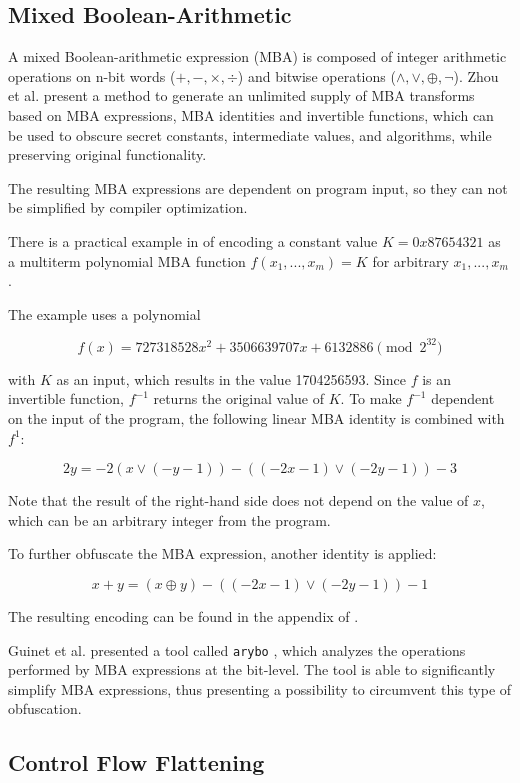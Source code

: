 \documentclass[
  digital, %
  notable,   %
  twoside, %
  nolof,     %
  nolot,     %
]{fithesis3}
\theoremstyle{definition}
\begin{document}
\subsection{Mixed Boolean-Arithmetic} \label{mba}
A mixed Boolean-arithmetic expression (MBA) is composed of integer arithmetic operations on n-bit words ($+,-,\times, \div$) and bitwise operations ($\wedge, \vee, \oplus, \neg$). Zhou et al. \cite{mba_zhou} present a method to generate an unlimited supply of MBA transforms based on MBA expressions, MBA identities and invertible functions, which can be used to obscure secret constants, intermediate values, and algorithms, while preserving original functionality. %

The resulting MBA expressions are dependent on program input, so they can not be simplified by compiler optimization. 

There is a practical example in \cite{mba_zhou} of encoding a constant value $K=0x87654321$ as a multiterm polynomial MBA function $f(x_1,...,x_m) = K$ for arbitrary $x_1,...,x_m$.

The example uses a polynomial

$$ f(x) = 727318528x^2 + 3506639707x + 6132886 \pmod{2^{32}}$$

with $K$ as an input, which results in the value 1704256593. Since $f$ is an invertible function, $f^{-1}$ returns the original value of $K$. To make $f^{-1}$ dependent on the input of the program, the following linear MBA identity is combined with $f^1$:

$$2y = -2(x \vee(-y-1))-((-2x-1)\vee(-2y-1))-3$$

Note that the result of the right-hand side does not depend on the value of $x$, which can be an arbitrary integer from the program.  

To further obfuscate the MBA expression, another identity is applied:

$$x + y = (x\oplus y) - ((-2x-1)\vee(-2y-1))-1$$

The resulting encoding can be found in the appendix of \cite{mba_zhou}.

Guinet et al. presented a tool called \texttt{arybo} \cite{guinet_arybo}, which analyzes the operations performed by MBA expressions at the bit-level. The tool is able to significantly simplify MBA expressions, thus presenting a possibility to circumvent this type of obfuscation. 

\subsection{Control Flow Flattening} \label{flatten}
\end{document}
